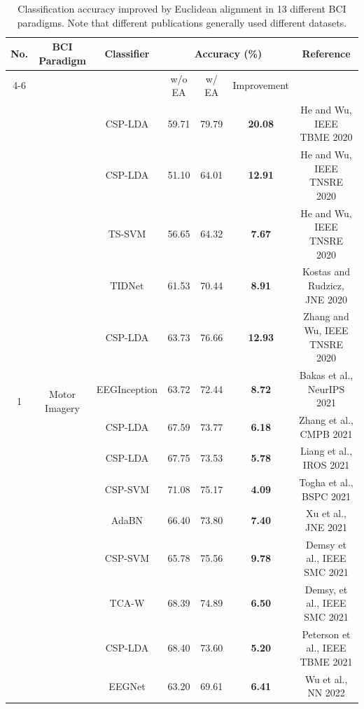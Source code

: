 \documentclass[journal]{IEEEtran}
\begin{document}
\begin{table}[htbp]\centering \footnotesize \setlength{\tabcolsep}{2mm}
\caption{Classification accuracy improved by Euclidean alignment in 13 different BCI paradigms. Note that different publications generally used different datasets.} \label{tab:EA}
\begin{tabular}{c|c|c|c|c|c|c}
\toprule
\multirow{2.5}{*}{No.} &\multirow{2.5}{*}{BCI Paradigm} & \multirow{2.5}{*}{Classifier}& \multicolumn{3}{c|}{Accuracy (\%)} & \multirow{2.5}{*}{Reference}\\ \cmidrule(lr){4-6}
&& & w/o EA & w/ EA & Improvement & \\ \midrule
\multirow{39}{*}{1} &\multirow{39}{*}{Motor Imagery}
& CSP-LDA & 59.71 & 79.79 & \textbf{20.08} & He and Wu, IEEE TBME 2020 \cite{drwuEA2020} \\
&& CSP-LDA & 51.10  & 64.01  & \textbf{12.91} & He and Wu, IEEE TNSRE 2020 \cite{drwuLA2020} \\
&& TS-SVM & 56.65 & 64.32 & \textbf{7.67} & He and Wu, IEEE TNSRE 2020 \cite{drwuLA2020} \\
&& TIDNet & 61.53 & 70.44 & \textbf{8.91} & Kostas and Rudzicz, JNE 2020 \cite{Kostas2020} \\
&& CSP-LDA & 63.73 & 76.66 & \textbf{12.93} & Zhang and Wu, IEEE TNSRE 2020 \cite{drwuMEKT2020}\\
&& EEGInception & 63.72 & 72.44 & \textbf{8.72} & Bakas et al., NeurIPS 2021 \cite{Bakas2021NIPS} \\
&& CSP-LDA & 67.59 & 73.77 & \textbf{6.18} & Zhang et al., CMPB 2021 \cite{Zhang2021CMPB} \\
&& CSP-LDA & 67.75 & 73.53 & \textbf{5.78} & Liang et al., IROS 2021 \cite{Liang2021IROS} \\
&& CSP-SVM & 71.08 & 75.17 & \textbf{4.09} & Togha et al., BSPC 2021 \cite{Togha2021BSPC}  \\
&& AdaBN & 66.40 & 73.80 & \textbf{7.40} & Xu et al., JNE 2021 \cite{Xu2021JNE} \\
&& CSP-SVM & 65.78 & 75.56 & \textbf{9.78} & Demsy et al., IEEE SMC 2021 \cite{Demsy2021SMC} \\
&& TCA-W & 68.39 & 74.89 & \textbf{6.50} & Demsy, et al., IEEE SMC 2021 \cite{Demsy2021SMC} \\
&& CSP-LDA & 68.40 & 73.60 & \textbf{5.20} & Peterson et al., IEEE TBME 2021 \cite{Peterson2021TBME}  \\
&& EEGNet & 63.20 & 69.61 & \textbf{6.41} & Wu et al., NN 2022 \cite{drwuTLBCI2022} \\

\end{tabular}
\end{table}
\end{document}
